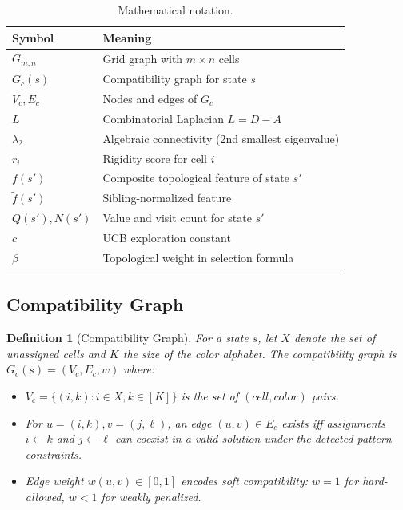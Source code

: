 \documentclass[11pt]{article}
\newtheorem{definition}{Definition}
\begin{document}
\begin{table}[h]
\centering
\caption{Mathematical notation.}
\label{tab:notation}
\begin{tabular}{ll}
\toprule
\textbf{Symbol} & \textbf{Meaning} \\
\midrule
$G_{m,n}$ & Grid graph with $m \times n$ cells \\
$G_c(s)$ & Compatibility graph for state $s$ \\
$V_c, E_c$ & Nodes and edges of $G_c$ \\
$L$ & Combinatorial Laplacian $L = D - A$ \\
$\lambda_2$ & Algebraic connectivity (2nd smallest eigenvalue) \\
$r_i$ & Rigidity score for cell $i$ \\
$f(s')$ & Composite topological feature of state $s'$ \\
$\widetilde{f}(s')$ & Sibling-normalized feature \\
$Q(s'), N(s')$ & Value and visit count for state $s'$ \\
$c$ & UCB exploration constant \\
$\beta$ & Topological weight in selection formula \\
\bottomrule
\end{tabular}
\end{table}

\subsection{Compatibility Graph}

\begin{definition}[Compatibility Graph]
\label{def:compat-graph}
For a state $s$, let $X$ denote the set of unassigned cells and $K$ the size of the color alphabet. The compatibility graph is $G_c(s) = (V_c, E_c, w)$ where:

\begin{itemize}
\item $V_c = \{(i, k) : i \in X, k \in [K]\}$ is the set of $(cell, color)$ pairs.

\item For $u = (i, k), v = (j, \ell)$, an edge $(u, v) \in E_c$ exists iff assignments $i \gets k$ and $j \gets \ell$ can coexist in a valid solution under the detected pattern constraints.

\item Edge weight $w(u, v) \in [0, 1]$ encodes soft compatibility: $w = 1$ for hard-allowed, $w < 1$ for weakly penalized.
\end{itemize}
\end{definition}
\end{document}
